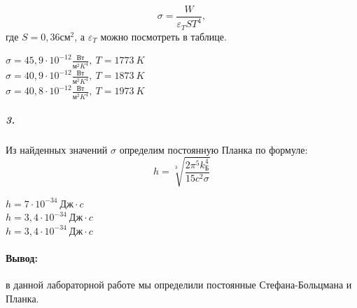 \documentclass[a4paper,12pt]{article}
\begin{document}
\begin{equation}
    \sigma = \frac{W}{\varepsilon_T S T^4},
\end{equation}
где $S=0,36см^2$, а $\varepsilon_T$ можно посмотреть в таблице.
\begin{center}
    $\sigma = 45,9\cdot 10^{-12}\frac{Вт}{м^2K^4}, ~ T = 1773~K$\\
    $\sigma = 40,9\cdot 10^{-12}\frac{Вт}{м^2K^4}, ~ T = 1873~K$\\
    $\sigma = 40,8\cdot 10^{-12}\frac{Вт}{м^2K^4}, ~ T = 1973~K$
\end{center}
\subparagraph{3.}Из найденных значений $\sigma$ определим постоянную Планка по формуле:
\begin{equation}
    h = \sqrt[3]{\frac{2\pi^5k_{Б}^4}{15c^2\sigma}}
\end{equation}

\begin{center}
    $h = 7\cdot 10^{-34}~Дж\cdot c$\\
    $h = 3,4\cdot 10^{-34}~Дж\cdot c$\\
    $h = 3,4\cdot 10^{-34}~Дж\cdot c$
\end{center}
\paragraph{Вывод:} в данной лабораторной работе мы определили постоянные Стефана-Больцмана и Планка.
\end{document}
